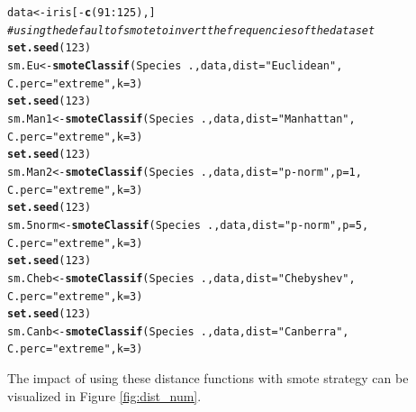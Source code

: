 \documentclass[10pt,a4paper]{article}\usepackage[]{graphicx}\usepackage[]{color}
\makeatletter
\newcommand{\hlnum}[1]{\textcolor[rgb]{0.686,0.059,0.569}{#1}}%
\newcommand{\hlstr}[1]{\textcolor[rgb]{0.192,0.494,0.8}{#1}}%
\newcommand{\hlcom}[1]{\textcolor[rgb]{0.678,0.584,0.686}{\textit{#1}}}%
\newcommand{\hlopt}[1]{\textcolor[rgb]{0,0,0}{#1}}%
\newcommand{\hlstd}[1]{\textcolor[rgb]{0.345,0.345,0.345}{#1}}%
\newcommand{\hlkwb}[1]{\textcolor[rgb]{0.69,0.353,0.396}{#1}}%
\newcommand{\hlkwc}[1]{\textcolor[rgb]{0.333,0.667,0.333}{#1}}%
\newcommand{\hlkwd}[1]{\textcolor[rgb]{0.737,0.353,0.396}{\textbf{#1}}}%
\newenvironment{kframe}{%
 \def\at@end@of@kframe{}%
 \ifinner\ifhmode%
  \def\at@end@of@kframe{\end{minipage}}%
  \begin{minipage}{\columnwidth}%
 \fi\fi%
 \def\FrameCommand##1{\hskip\@totalleftmargin \hskip-\fboxsep
 \colorbox{shadecolor}{##1}\hskip-\fboxsep
     \hskip-\linewidth \hskip-\@totalleftmargin \hskip\columnwidth}%
 \MakeFramed {\advance\hsize-\width
   \@totalleftmargin\z@ \linewidth\hsize
   \@setminipage}}%
 {\par\unskip\endMakeFramed%
 \at@end@of@kframe}
\newenvironment{knitrout}{}{} %
\makeatother
\begin{document}
\begin{knitrout}\footnotesize
{}\color{fgcolor}\begin{kframe}
\begin{alltt}
\hlstd{data} \hlkwb{<-} \hlstd{iris[}\hlopt{-}\hlkwd{c}\hlstd{(}\hlnum{91}\hlopt{:}\hlnum{125}\hlstd{),]}
\hlcom{# using the default of smote to invert the frequencies of the data set}
\hlkwd{set.seed}\hlstd{(}\hlnum{123}\hlstd{)}
\hlstd{sm.Eu} \hlkwb{<-} \hlkwd{smoteClassif}\hlstd{(Species}\hlopt{~}\hlstd{., data,} \hlkwc{dist}\hlstd{=}\hlstr{"Euclidean"}\hlstd{,}
                      \hlkwc{C.perc}\hlstd{=}\hlstr{"extreme"}\hlstd{,} \hlkwc{k}\hlstd{=}\hlnum{3}\hlstd{)}
\hlkwd{set.seed}\hlstd{(}\hlnum{123}\hlstd{)}
\hlstd{sm.Man1} \hlkwb{<-} \hlkwd{smoteClassif}\hlstd{(Species}\hlopt{~}\hlstd{., data,} \hlkwc{dist}\hlstd{=}\hlstr{"Manhattan"}\hlstd{,}
                        \hlkwc{C.perc}\hlstd{=}\hlstr{"extreme"}\hlstd{,} \hlkwc{k}\hlstd{=}\hlnum{3}\hlstd{)}
\hlkwd{set.seed}\hlstd{(}\hlnum{123}\hlstd{)}
\hlstd{sm.Man2} \hlkwb{<-} \hlkwd{smoteClassif}\hlstd{(Species}\hlopt{~}\hlstd{., data,} \hlkwc{dist}\hlstd{=}\hlstr{"p-norm"}\hlstd{,} \hlkwc{p}\hlstd{=}\hlnum{1}\hlstd{,}
                        \hlkwc{C.perc}\hlstd{=}\hlstr{"extreme"}\hlstd{,} \hlkwc{k}\hlstd{=}\hlnum{3}\hlstd{)}
\hlkwd{set.seed}\hlstd{(}\hlnum{123}\hlstd{)}
\hlstd{sm.5norm} \hlkwb{<-} \hlkwd{smoteClassif}\hlstd{(Species}\hlopt{~}\hlstd{., data,} \hlkwc{dist}\hlstd{=}\hlstr{"p-norm"}\hlstd{,} \hlkwc{p}\hlstd{=}\hlnum{5}\hlstd{,}
                         \hlkwc{C.perc}\hlstd{=}\hlstr{"extreme"}\hlstd{,} \hlkwc{k}\hlstd{=}\hlnum{3}\hlstd{)}
\hlkwd{set.seed}\hlstd{(}\hlnum{123}\hlstd{)}
\hlstd{sm.Cheb} \hlkwb{<-} \hlkwd{smoteClassif}\hlstd{(Species}\hlopt{~}\hlstd{., data,} \hlkwc{dist}\hlstd{=}\hlstr{"Chebyshev"}\hlstd{,}
                        \hlkwc{C.perc}\hlstd{=}\hlstr{"extreme"}\hlstd{,} \hlkwc{k}\hlstd{=}\hlnum{3}\hlstd{)}
\hlkwd{set.seed}\hlstd{(}\hlnum{123}\hlstd{)}
\hlstd{sm.Canb} \hlkwb{<-} \hlkwd{smoteClassif}\hlstd{(Species}\hlopt{~}\hlstd{., data,} \hlkwc{dist}\hlstd{=}\hlstr{"Canberra"}\hlstd{,}
                        \hlkwc{C.perc}\hlstd{=}\hlstr{"extreme"}\hlstd{,} \hlkwc{k}\hlstd{=}\hlnum{3}\hlstd{)}
\end{alltt}
\end{kframe}
\end{knitrout}

The impact of using these distance functions with smote strategy can be visualized in Figure \ref{fig:dist_num}.
\end{document}
